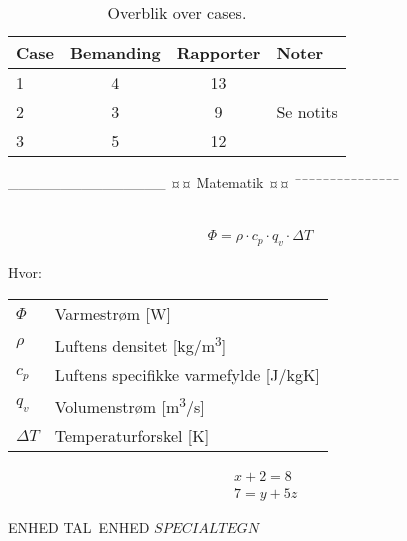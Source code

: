 \begin{table}[H]
	\centering
	\begin{tabular}{lccl}	%
		\toprule
		Case & Bemanding & Rapporter & Noter \\\midrule
		1 & 4 & 13 &            \\
		2 & 3 & 9  & Se notits  \\
		3 & 5 & 12 &            \\
		\bottomrule
	\end{tabular}
	\caption{Overblik over cases.}
	\label{tab:cases}
\end{table}



_______________
¤¤ Matematik ¤¤
¯¯¯¯¯¯¯¯¯¯¯¯¯¯¯

\begin{align}
		
	\label{eq:LABEL} %
\end{align}

\begin{align}
	\Phi = \rho \cdot c_p \cdot q_v \cdot \Delta T
	\label{eq:varmeflux}
\end{align}

Hvor:
\begin{table}[H]
	\begin{tabular}{l|l}
	$\Phi$     & Varmestrøm [\si{W}] \\
	$\rho$ 	   & Luftens densitet [\si{kg/m^3}] \\
	$c_p$ 	   & Luftens specifikke varmefylde [\si{J/kgK}] \\
	$q_v$	   & Volumenstrøm [\si{m^3/s}] \\
	$\Delta T$ & Temperaturforskel [\si{K}]
	\end{tabular}
\end{table}

\begin{align}
& x + 2 = 8 	\label{eq:lign1} \\ 	%
& 7 = y + 5 z 	\label{eq:lign2}
\end{align}

\si{ENHED}
\SI{TAL}{ENHED}
$SPECIALTEGN$

